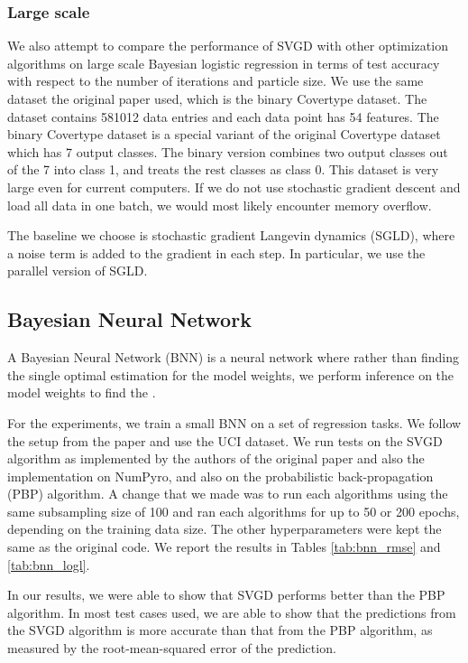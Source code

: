 \subsubsection{Large scale}
We also attempt to compare the performance of SVGD with other optimization algorithms on large scale Bayesian logistic regression in terms of test accuracy with respect to the number of iterations and particle size. We use the same dataset the original paper used, which is the binary Covertype dataset. The dataset contains 581012 data entries and each data point has 54 features. The binary Covertype dataset is a special variant of the original Covertype dataset which has 7 output classes. The binary version combines two output classes out of the 7 into class 1, and treats the rest classes as class 0. This dataset is very large even for current computers. If we do not use stochastic gradient descent and load all data in one batch, we would most likely encounter memory overflow. 

The baseline we choose is stochastic gradient Langevin dynamics (SGLD), where a noise term is added to the gradient in each step. In particular, we use the parallel version of SGLD. 






\subsection{Bayesian Neural Network}

A Bayesian Neural Network (BNN) is a neural network where rather than finding the single optimal estimation for the model weights, we perform inference on the model weights to find the .

For the experiments, we train a small BNN on a set of regression tasks. We follow the setup from the paper and use the UCI dataset. We run tests on the SVGD algorithm as implemented by the authors of the original paper and also the implementation on NumPyro, and also on the probabilistic back-propagation (PBP) algorithm. A change that we made was to run each algorithms using the same subsampling size of 100 and ran each algorithms for up to 50 or 200 epochs, depending on the training data size. The other hyperparameters were kept the same as the original code. We report the results in Tables \ref{tab:bnn_rmse} and \ref{tab:bnn_logl}. 



In our results, we were able to show that SVGD performs better than the PBP algorithm. In most test cases used, we are able to show that the predictions from the SVGD algorithm is more accurate than that from the PBP algorithm, as measured by the root-mean-squared error of the prediction. 

